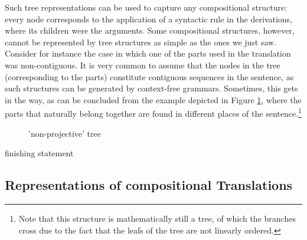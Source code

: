\documentclass{report}
\theoremstyle{break}
\begin{document}
Such tree representations can be used to capture any compositional structure: every node corresponds to the application of a syntactic rule in the derivations, where its children were the arguments. Some compositional structures, however, cannot be represented by tree structures as simple as the ones we just saw. Consider for instance the case in which one of the parts used in the translation was non-contiguous. It is very common to assume that the nodes in the tree (corresponding to the parts) constitute contiguous sequences in the sentence, as such structures can be generated by context-free grammars. Sometimes, this gets in the way, as can be concluded from the example depicted in Figure \ref{fig:struct3}, where the parts that naturally belong together are found in different places of the sentence.\footnote{Note that this structure is mathematically still a tree, of which the branches cross due to the fact that the leafs of the tree are not linearly ordered.}

\begin{figure}[!ht]
\centering
{}
\caption{'non-projective' tree}\label{fig:struct3}
\end{figure}


finishing statement

\subsection{Representations of compositional Translations}
\end{document}
